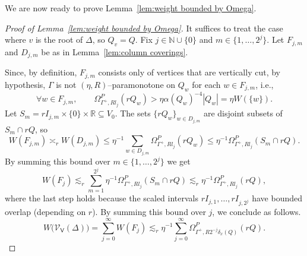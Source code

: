 \documentclass[11pt,reqno]{amsart}
\newcommand{\N}{\mathbb{N}}
\newcommand{\R}{\mathbb{R}}
\renewcommand{\approx}{\asymp}
\newcommand{\0}{\mathbf{0}}
\renewcommand{\1}{\mathbf 1}
\renewcommand{\subset}{\subseteq}
\renewcommand{\le}{\leqslant}
\theoremstyle{remark}
\newcommand{\cVv}{{\mathcal{V}_{\mathsf{V}}}}
\begin{document}
We are now ready to prove Lemma~\ref{lem:weight bounded by Omega}.
\begin{proof}[{Proof of Lemma~\ref{lem:weight bounded by Omega}}]
  It suffices to treat the case where $v$ is the root of $\Delta$, so $Q_v=Q$.  Fix $j\in \N\cup \{0\}$ and $m\in \{1,\ldots,2^j\}$. Let $F_{j,m}$ and $D_{j,m}$ be as in Lemma~\ref{lem:column coverings}.

  Since, by definition,   $F_{j,m}$ consists only of vertices that are vertically cut, by hypothesis, $\Gamma$ is not $(\eta, R)$--paramonotone on $Q_w$  for each $w\in F_{j,m}$, i.e.,
  $$\forall w\in F_{j,m},\qquad \Omega^P_{\Gamma^+,R l_j}(r Q_w) > \eta \alpha(Q_w)^{-4}|Q_w|=\eta W(\{w\}).$$
  Let $S_m=r I_{j,m}\times\{0\}\times  \R\subset V_0$.  The sets $\{rQ_w\}_{w\in D_{j,m}}$ are disjoint subsets of $S_m\cap r Q$, so
  $$W(F_{j,m}) \approx_r W(D_{j,m})\le \eta^{-1} \sum_{w\in D_{j,m}}\Omega^P_{\Gamma^+,R l_j}(r Q_w) \le \eta^{-1} \Omega^P_{\Gamma^+,R l_j}(S_m\cap rQ).$$
By summing this bound over $m\in \{1,\ldots,2^j\}$ we get
  \begin{equation*}\label{eq:Fi packing condition}
    W(F_{j}) \lesssim_r \sum_{m=1}^{2^j}\eta^{-1} \Omega^P_{\Gamma^+,R l_j}(S_m\cap rQ) \lesssim_r \eta^{-1} \Omega^P_{\Gamma^+,R l_j}(rQ),
  \end{equation*}
  where the last step holds because the scaled intervals $r I_{j,1},\ldots,r I_{j,2^j}$ have bounded overlap (depending on $r$).
By summing this bound over $j$, we conclude as follows.
  \begin{equation*}W\big(\cVv(\Delta)\big)=\sum_{j=0}^\infty W(F_{j}) \lesssim_{r}\eta^{-1} \sum_{j=0}^\infty \Omega^P_{\Gamma^+,R 2^{-j}\delta_x(Q)}(r Q).\tag*{\qedhere}\end{equation*}
\end{proof}
\end{document}
